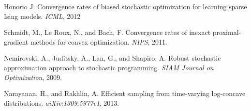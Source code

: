 \documentclass[psamsfonts]{article}
\theoremstyle{definition}
\theoremstyle{remark}
\numberwithin{equation} {section}
\begin{document}
\begin{thebibliography}{9}

Honorio J.
Convergence rates of biased stochastic optimization for learning sparse Ising models.
\emph{ICML}, 2012

Schmidt, M., Le Roux, N., and Bach, F.
Convergence rates of inexact proximal-gradient methods for convex optimization.
\emph{NIPS}, 2011.

Nemirovski, A., Juditsky, A., Lan, G., and Shapiro, A.
Robust stochastic approximation approach to stochastic programming.
\emph{SIAM Journal on Optimization}, 2009.

Narayanan, H., and Rakhlin, A.
Efficient sampling from time-varying log-concave distributions.
\emph{aiXiv:1309.5977v1}, 2013.

\end{thebibliography}
\end{document}
